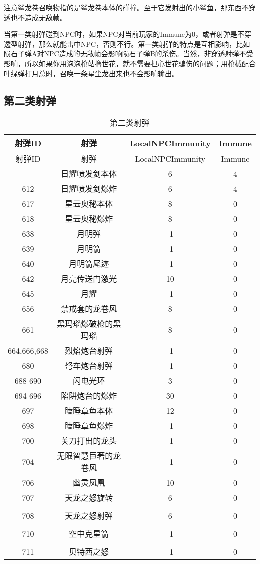 注意鲨龙卷召唤物指的是鲨龙卷本体的碰撞。至于它发射出的小鲨鱼，那东西不穿透也不造成无敌帧。

当第一类射弹碰到NPC时，如果NPC对当前玩家的Immune为0，或者射弹是不穿透型射弹，那么就能击中NPC，否则不行。第一类射弹的特点是互相影响，比如陨石子弹A对NPC造成的无敌帧会影响陨石子弹B的杀伤。当然，非穿透射弹不受影响，所以如果你用泡泡枪站撸世花，就不需要担心世花骗伤的问题；用枪械配合叶绿弹打月总时，召唤一条星尘龙出来也不会影响输出。

\subsection{第二类射弹}

\begin{longtable}{|c|c|c|c|}
\caption{第二类射弹}\\ \hline
射弹ID & 射弹 & LocalNPCImmunity & Immune\\\hline
\endfirsthead
\hline 射弹ID & 射弹 & LocalNPCImmunity & Immune\\\hline
\endhead
\hline
\endfoot
611 & 日耀喷发剑本体 & 6 & 4 \\ \hline
612 & 日耀喷发剑爆炸 & 6 & 4 \\ \hline
617 & 星云奥秘本体 & 8 & 0 \\ \hline
618 & 星云奥秘爆炸 & 8 & 0 \\ \hline
638 & 月明弹 & -1 & 0 \\ \hline
639 & 月明箭 & -1 & 0 \\ \hline
640 & 月明箭尾迹 & -1 & 0 \\ \hline
642 & 月亮传送门激光 & 10 & 0 \\ \hline
645 & 月耀 & -1 & 0 \\ \hline
656 & 禁戒套的龙卷风 & 8 & 0 \\ \hline
661 & 黑玛瑙爆破枪的黑玛瑙 & 8 & 0 \\ \hline
664,666,668 & 烈焰炮台射弹 & -1 & 0 \\ \hline
680 & 弩车炮台射弹 & -1 & 0 \\ \hline
688-690 & 闪电光环 & 3 & 0 \\ \hline
694-696 & 陷阱炮台的爆炸 & 30 & 0 \\ \hline
697 & 瞌睡章鱼本体 & 12 & 0 \\ \hline
698 & 瞌睡章鱼爆炸 & -1 & 0 \\ \hline
700 & 关刀打出的龙头 & -1 & 0 \\ \hline
704 & 无限智慧巨著的龙卷风 & -1 & 0 \\ \hline
706 & 幽灵凤凰 & 10 & 0 \\ \hline
707 & 天龙之怒旋转 & 6 & 0 \\ \hline\\
708 & 天龙之怒射弹 & 6 & 0 \\ \hline\\
710 & 空中克星箭 & -1 & 0 \\ \hline\\
711 & 贝特西之怒 & -1 & 0
\end{longtable}

